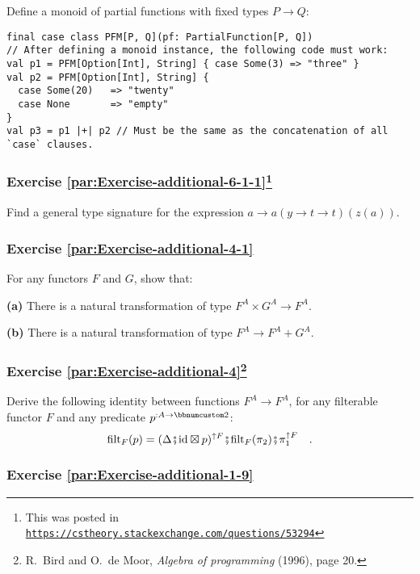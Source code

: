 Define a monoid of partial functions with fixed types $P\rightarrow Q$:
\begin{lstlisting}
final case class PFM[P, Q](pf: PartialFunction[P, Q])
// After defining a monoid instance, the following code must work:
val p1 = PFM[Option[Int], String] { case Some(3) => "three" }
val p2 = PFM[Option[Int], String] {
  case Some(20)   => "twenty"
  case None       => "empty"
}
val p3 = p1 |+| p2 // Must be the same as the concatenation of all `case` clauses.
\end{lstlisting}


\subsubsection{Exercise \label{par:Exercise-additional-6-1-1}\ref{par:Exercise-additional-6-1-1}\protect\footnote{This was posted in \texttt{\protect\href{https://cstheory.stackexchange.com/questions/53294}{https://cstheory.stackexchange.com/questions/53294}}}}

Find a general type signature for the expression $a\rightarrow a(y\rightarrow t\rightarrow t)(z(a))$. 

\subsubsection{Exercise \label{par:Exercise-additional-4-1}\ref{par:Exercise-additional-4-1}}

For any functors $F$ and $G$, show that:

\textbf{(a)} There is a natural transformation of type $F^{A}\times G^{A}\rightarrow F^{A}$.

\textbf{(b)} There is a natural transformation of type $F^{A}\rightarrow F^{A}+G^{A}$.

\subsubsection{Exercise \label{par:Exercise-additional-4}\ref{par:Exercise-additional-4}\protect\footnote{R.~Bird and O.~de Moor, \emph{Algebra of programming} (1996), page
20.}}

Derive the following identity between functions $F^{A}\rightarrow F^{A}$,
for any filterable functor $F$ and any predicate $p^{:A\rightarrow\bbnum 2}$:
\[
\text{filt}_{F}(p)=(\Delta\bef\text{id}\boxtimes p)^{\uparrow F}\bef\text{filt}_{F}(\pi_{2})\bef\pi_{1}^{\uparrow F}\quad.
\]


\subsubsection{Exercise \label{par:Exercise-additional-1-9}\ref{par:Exercise-additional-1-9}}

